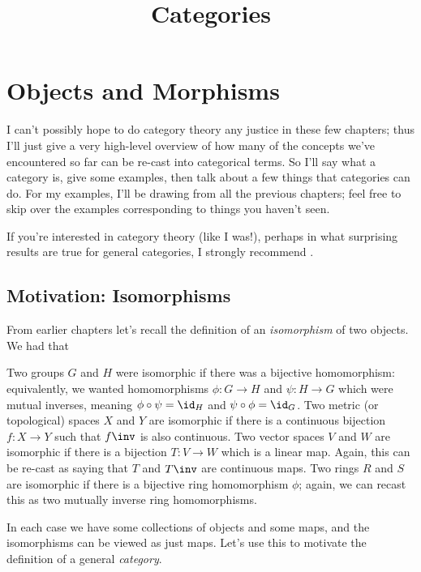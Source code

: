 \documentclass[11pt]{scrreprt}
\begin{document}
\title{Categories}
\maketitle

\chapter{Objects and Morphisms}
I can't possibly hope to do category theory any justice in these few chapters;
thus I'll just give a very high-level overview of how many of the concepts we've
encountered so far can be re-cast into categorical terms.
So I'll say what a category is, give some examples,
then talk about a few things that categories can do.
For my examples, I'll be drawing from all the previous chapters;
feel free to skip over the examples corresponding to things you haven't seen.

If you're interested in category theory (like I was!), perhaps in
what surprising results are true for general categories, I strongly recommend \cite{ref:msci}.

\section{Motivation: Isomorphisms}
From earlier chapters let's recall the definition of an \emph{isomorphism} of two objects.
We had that
\begin{itemize}
	\ii Two groups $G$ and $H$ were isomorphic if there was a bijective homomorphism:
	equivalently, we wanted homomorphisms $\phi : G \to H$ and $\psi : H \to G$
	which were mutual inverses, meaning $\phi \circ \psi = \id_H$ and $\psi \circ \phi = \id_G$.
	\ii Two metric (or topological) spaces $X$ and $Y$ are isomorphic
	if there is a continuous bijection $f : X \to Y$ such that $f\inv$ is also continuous.
	\ii Two vector spaces $V$ and $W$ are isomorphic if there is a bijection $T : V \to W$
	which is a linear map.
	Again, this can be re-cast as saying that $T$ and $T\inv$ are continuous maps.
	\ii Two rings $R$ and $S$ are isomorphic if there is a bijective ring homomorphism $\phi$;
	again, we can recast this as two mutually inverse ring homomorphisms.
\end{itemize}

In each case we have some collections of objects and some maps,
and the isomorphisms can be viewed as just maps.
Let's use this to motivate the definition of a general \emph{category}.
\end{document}
